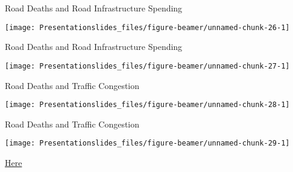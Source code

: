 \documentclass[ignorenonframetext,]{beamer}
\begin{document}
\begin{frame}{Road Deaths and Road Infrastructure Spending}

\begin{center}\texttt{[image: Presentationslides\_files/figure-beamer/unnamed-chunk-26-1]} \end{center}

\end{frame}

\begin{frame}{Road Deaths and Road Infrastructure Spending}

\begin{center}\texttt{[image: Presentationslides\_files/figure-beamer/unnamed-chunk-27-1]} \end{center}

\end{frame}

\begin{frame}{Road Deaths and Traffic Congestion}

\begin{center}\texttt{[image: Presentationslides\_files/figure-beamer/unnamed-chunk-28-1]} \end{center}

\end{frame}

\begin{frame}{Road Deaths and Traffic Congestion}

\begin{center}\texttt{[image: Presentationslides\_files/figure-beamer/unnamed-chunk-29-1]} \end{center}

\href{https://pelzma.shinyapps.io/interactive_plot/}{Here}

\end{frame}
\end{document}
